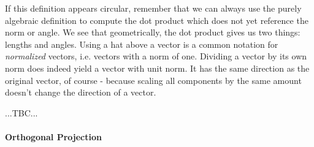 If this definition appears circular, remember that we can always use the purely algebraic definition to compute the dot product which does not yet reference the norm or angle. We see that geometrically, the dot product gives us two things: lengths and angles. Using a hat above a vector is a common notation for \emph{normalized} vectors, i.e. vectors with a norm of one. Dividing a vector by its own norm does indeed yield a vector with unit norm. It has the same direction as the original vector, of course - because scaling all components by the same amount doesn't change the direction of a vector.

 ...TBC...




\paragraph{Orthogonal Projection}


